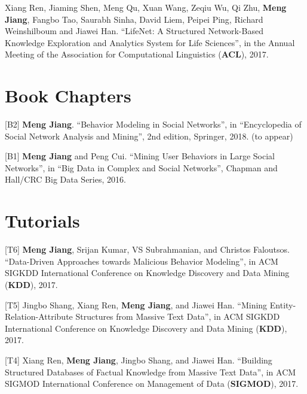 \documentclass[margin, 9pt]{res}
\begin{document}
\begin{resume}
[D1] Xiang Ren, Jiaming Shen, Meng Qu, Xuan Wang, Zeqiu Wu, Qi Zhu, \textbf{Meng Jiang}, Fangbo Tao, Saurabh Sinha, David Liem, Peipei Ping, Richard Weinshilboum and Jiawei Han. ``LifeNet: A Structured Network-Based Knowledge Exploration and Analytics System for Life Sciences'', in the Annual Meeting of the Association for Computational Linguistics (\textbf{ACL}), 2017.


\section{Book Chapters}

[B2] \textbf{Meng Jiang}. ``Behavior Modeling in Social Networks'', in ``Encyclopedia of Social Network Analysis and Mining'', 2nd edition, Springer, 2018. (to appear)

[B1] \textbf{Meng Jiang} and Peng Cui. ``Mining User Behaviors in Large Social Networks'', in ``Big Data in Complex and Social Networks'', Chapman and Hall/CRC Big Data Series, 2016.


\section{Tutorials}

[T6] \textbf{Meng Jiang}, Srijan Kumar, VS Subrahmanian, and Christos Faloutsos. ``Data-Driven Approaches towards Malicious Behavior Modeling'', in ACM SIGKDD International Conference on Knowledge Discovery and Data Mining (\textbf{KDD}), 2017.

[T5] Jingbo Shang, Xiang Ren, \textbf{Meng Jiang}, and Jiawei Han. ``Mining Entity-Relation-Attribute Structures from Massive Text Data'', in ACM SIGKDD International Conference on Knowledge Discovery and Data Mining (\textbf{KDD}), 2017.

[T4] Xiang Ren, \textbf{Meng Jiang}, Jingbo Shang, and Jiawei Han. ``Building Structured Databases of Factual Knowledge from Massive Text Data'', in ACM SIGMOD International Conference on Management of Data (\textbf{SIGMOD}), 2017.


\end{resume}
\end{document}
